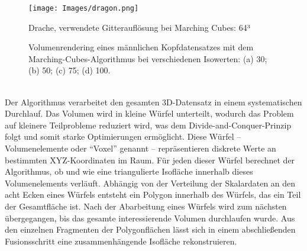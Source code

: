 \documentclass[12pt]{article}
\begin{document}
\begin{figure}[htbp]
    \centering
    \begin{minipage}{0.45\textwidth}
        \centering
        \texttt{[image: Images/dragon.png]}
        \caption{Drache, verwendete Gitterauflösung bei Marching Cubes: 64³}
        \label{fig:marchingcubes}
    \end{minipage}
    \hfill
    \begin{minipage}{0.45\textwidth}
        \centering
        \caption{Volumenrendering eines männlichen Kopfdatensatzes mit dem Marching-Cubes-Algorithmus bei verschiedenen Isowerten: (a) 30; (b) 50; (c) 75; (d) 100.}
        \label{fig:renderingresults}
    \end{minipage}
\end{figure}\\
Der Algorithmus verarbeitet den gesamten 3D-Datensatz in einem systematischen Durchlauf.
Das Volumen wird in kleine Würfel unterteilt, wodurch das Problem auf kleinere Teilprobleme reduziert wird, was dem Divide-and-Conquer-Prinzip folgt und somit starke Optimierungen ermöglicht.
Diese Würfel – Volumenelemente oder ``Voxel'' genannt – repräsentieren diskrete Werte an bestimmten XYZ-Koordinaten im Raum.
Für jeden dieser Würfel berechnet der Algorithmus, ob und wie eine triangulierte Isofläche innerhalb dieses Volumenelements verläuft.
Abhängig von der Verteilung der Skalardaten an den acht Ecken eines Würfels entsteht ein Polygon innerhalb des Würfels, das ein Teil der Gesamtfläche ist.
Nach der Abarbeitung eines Würfels wird zum nächsten übergegangen, bis das gesamte interessierende Volumen durchlaufen wurde.
Aus den einzelnen Fragmenten der Polygonflächen lässt sich in einem abschließenden Fusionsschritt eine zusammenhängende Isofläche rekonstruieren.
\newpage
\end{document}
